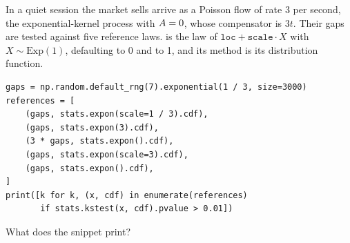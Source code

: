 \begin{question}
\label{question.exponentialReferenceOfAPoissonFlow}
In a quiet session the market sells arrive as a Poisson flow of rate 3 per second,
the exponential-kernel process with $A = 0$,
whose compensator is $3t$.
Their gaps are tested against five reference laws.
 is the law of $\mathtt{loc} + \mathtt{scale} \cdot X$ with $X \sim \mathrm{Exp}(1)$,
 defaulting to 0 and  to 1,
and its method  is its distribution function.
\begin{lstlisting}[caption={Five reference laws for the gaps of a Poisson flow}, label=listing.exponentialReferences]
gaps = np.random.default_rng(7).exponential(1 / 3, size=3000)
references = [
    (gaps, stats.expon(scale=1 / 3).cdf),
    (gaps, stats.expon(3).cdf),
    (3 * gaps, stats.expon().cdf),
    (gaps, stats.expon(scale=3).cdf),
    (gaps, stats.expon().cdf),
]
print([k for k, (x, cdf) in enumerate(references)
       if stats.kstest(x, cdf).pvalue > 0.01])
\end{lstlisting}
What does the snippet print?
\begin{choices}
 \choice \codehl{[0, 1, 2]}
 \choice \codehl{[2, 3]}
 \choice \codehl{[0, 2, 4]}
 \correctchoice \codehl{[0, 2]}
 \choice \codehl{[2]}
\end{choices}
\end{question}


